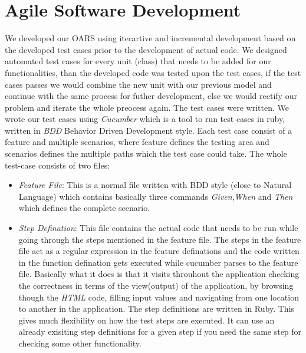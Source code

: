 \documentclass[letterpaper,12pt]{article}
\begin{document}
\section{Agile Software Development}
We developed our OARS using iterartive and incremental development based on the developed test cases prior to the development of actual code. We designed automated test cases for every unit (class) that needs to be added for our functionalities, than the developed code was tested upon the test cases, if the test cases passes we would combine the new unit with our previous model and continue with the same process for futher development, else we would rectify our problem and iterate the whole preocess again. The test cases were written. We wrote our test cases using \emph{Cucumber} which is a tool to run test cases in ruby, written in \emph{BDD}  Behavior Driven Development style. Each test case consist of a feature and multiple scenarios, where feature defines the testing area and scenarios defines the multiple paths which the test case could take. The whole test-case consists of two files:
\begin{itemize}
\item \emph{Feature File}: This is a normal file written with BDD style (close to Natural Language) which contains basically three commands \emph{Given},\emph{When} and \emph{Then} which defines the complete scenario.
\item \emph{Step Defination}: This file contains the actual code that needs to be run while going through the steps mentioned in the feature file. The steps in the feature file act as a regular expression in the feature definations and the code written in the function defination gets executed while cucumber parses to the feature file. Basically what it does is that it visits throuhout the application checking the correctness in terms of the view(output) of the application, by browsing though the \emph{HTML} code, filling input values and navigating from one location to another in the application. The step definitions are written in Ruby. This gives much flexibility on how the test steps are executed. It can use an already exisiting step definitions for a given step if you need the same step for checking some other functionality.
\end{itemize} 
\end{document}
